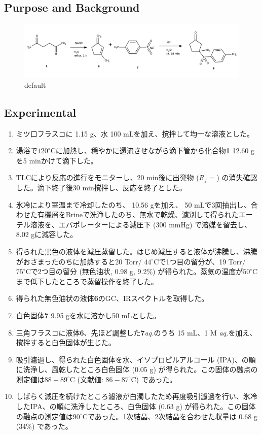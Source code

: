 \documentclass{ltjsarticle}
\theoremstyle{definition}
\numberwithin{equation}{section}
\newcommand{\D}{^\circ\text{C}}
\begin{document}
\subsection{Purpose and Background}
\begin{figure}[htbp]
\begin{center}
\includegraphics[width = 15 cm]{scheme6-2.png}
\caption{default}
\label{default}
\end{center}
\end{figure}

\subsection{Experimental}
\begin{enumerate}
\item ミツ口フラスコに 1.15 g、水 100 mLを加え、撹拌して均一な溶液とした。
\item 湯浴で$120\D$に加熱し、穏やかに還流させながら滴下管から化合物\textbf{1} 12.60 gを5 minかけて滴下した。 
\item TLCにより反応の進行をモニターし、20 min後に出発物 ($R_f = %
$) の消失確認した。滴下終了後30 min撹拌し、反応を終了とした。
\item 氷冷により室温まで冷却したのち、 10.56 gを加え、 50 mLで3回抽出し、合わせた有機層をBrineで洗浄したのち、無水で乾燥、濾別して得られたエーテル溶液を、エバポレーターによる減圧下 (300 mmHg) で溶媒を留去し、8.02 gに減容した。
\item 得られた黒色の液体を減圧蒸留した。はじめ減圧すると液体が沸騰し、沸騰がおさまったのちに加熱すると20 Torr/ $44\D$で1つ目の留分が、19 Torr/ $75\D$で2つ目の留分 (無色油状, 0.98 g, 9.2\%) が得られた。蒸気の温度が$50\D$まで低下したところで蒸留操作を終了した。
\item 得られた無色油状の液体\textbf{6}のGC、IRスペクトルを取得した。
\item 白色固体\textbf{7} 9.95 gを水に溶かし50 mLとした。
\item 三角フラスコに液体\textbf{6}、先ほど調整した\textbf{7}\textit{aq.}のうち 15 mL、1 M \textit{aq.}を加え、撹拌すると白色固体が生じた。
\item 吸引濾過し、得られた白色固体を水、イソプロピルアルコール (IPA)、の順に洗浄し、風乾したところ白色固体 (0.05 g) が得られた。この固体の融点の測定値は$88-89\D$ (文献値: $86-87\D$) であった。
\item しばらく減圧を続けたところ濾液が白濁したため再度吸引濾過を行い、氷冷したIPA、の順に洗浄したところ、白色固体 (0.63 g) が得られた。この固体の融点の測定値は$90\D$であった。1次結晶、2次結晶を合わせた収量は 0.68 g (34\%) であった。
\end{enumerate}
\end{document}

